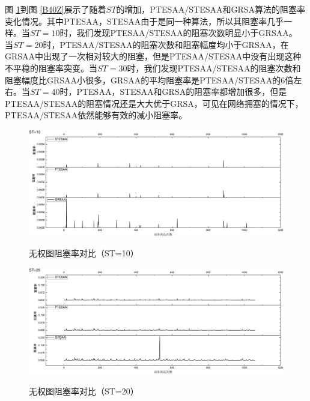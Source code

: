 图 \ref{B10Z}到图 \ref{B40Z}展示了随着$ST$的增加，PTESAA/STESAA和GRSA算法的阻塞率变化情况。其中PTESAA，STESAA由于是同一种算法，所以其阻塞率几乎一样。当$ST=10$时，我们发现PTESAA/STESAA的阻塞次数明显小于GRSAA。 当$ST=20$时，PTESAA/STESAA的阻塞次数和阻塞幅度均小于GRSAA，在GRSAA中出现了一次相对较大的阻塞，但是PTESAA/STESAA中没有出现这种不平稳的阻塞率突变。当$ST=30$时，我们发现PTESAA/STESAA的阻塞次数和阻塞幅度比GRSAA小很多，GRSAA的平均阻塞率是PTESAA/STESAA的6倍左右。当$ST=40$时，PTESAA，STESAA和GRSA的阻塞率都增加很多，但是PTESAA/STESAA的阻塞情况还是大大优于GRSA，可见在网络拥塞的情况下，PTESAA/STESAA依然能够有效的减小阻塞率。
\begin{figure}
\setlength{\belowcaptionskip}{-0.5cm}
\begin{center}
{\includegraphics[width=1 \textwidth]{figures/B10Z.pdf}}
\end{center}
\caption{{\footnotesize{无权图阻塞率对比（ST=10）}}}
\label{B10Z}
\end{figure}
\begin{figure}
\setlength{\belowcaptionskip}{-0.5cm}
\begin{center}
{\includegraphics[width=1 \textwidth]{figures/B20Z.pdf}}
\end{center}
\caption{{\footnotesize{无权图阻塞率对比（ST=20）}}}
\label{B20Z}
\end{figure}
